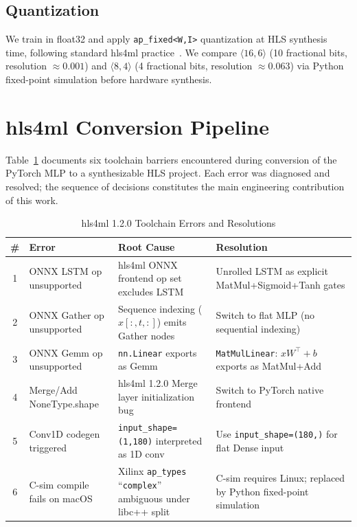 \documentclass[conference]{IEEEtran}
\begin{document}
\subsection{Quantization}
We train in float32 and apply \texttt{ap\_fixed<W,I>} quantization at HLS synthesis
time, following standard hls4ml practice~\cite{duarte2018fast}. We compare
$\langle 16,6\rangle$ (10 fractional bits, resolution $\approx 0.001$) and
$\langle 8,4\rangle$ (4 fractional bits, resolution $\approx 0.063$) via
Python fixed-point simulation before hardware synthesis.


\section{hls4ml Conversion Pipeline}
\label{sec:hls}

Table~\ref{tab:hls_errors} documents six toolchain barriers encountered
during conversion of the PyTorch MLP to a synthesizable HLS project.
Each error was diagnosed and resolved; the sequence of decisions constitutes
the main engineering contribution of this work.

\begin{table}[t]
  \centering
  \caption{hls4ml 1.2.0 Toolchain Errors and Resolutions}
  \label{tab:hls_errors}
  \begin{tabular}{clll}
    \toprule
    \# & Error & Root Cause & Resolution \\
    \midrule
    1 & ONNX LSTM op unsupported
      & hls4ml ONNX frontend op set excludes LSTM
      & Unrolled LSTM as explicit MatMul+Sigmoid+Tanh gates \\
    2 & ONNX Gather op unsupported
      & Sequence indexing ($x[:,t,:]$) emits Gather nodes
      & Switch to flat MLP (no sequential indexing) \\
    3 & ONNX Gemm op unsupported
      & \texttt{nn.Linear} exports as Gemm
      & \texttt{MatMulLinear}: $xW^\top + b$ exports as MatMul+Add \\
    4 & Merge/Add NoneType.shape
      & hls4ml 1.2.0 Merge layer initialization bug
      & Switch to PyTorch native frontend \\
    5 & Conv1D codegen triggered
      & \texttt{input\_shape=(1,180)} interpreted as 1D conv
      & Use \texttt{input\_shape=(180,)} for flat Dense input \\
    6 & C-sim compile fails on macOS
      & Xilinx \texttt{ap\_types} ``\texttt{complex}'' ambiguous under libc++ split
      & C-sim requires Linux; replaced by Python fixed-point simulation \\
    \bottomrule
  \end{tabular}
\end{table}
\end{document}
